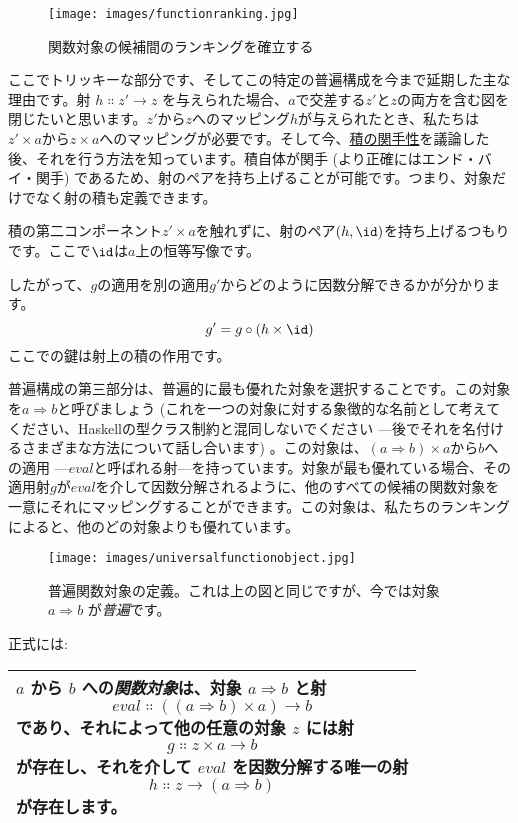 \begin{figure}[H]
  \centering
  \texttt{[image: images/functionranking.jpg]}
  \caption{関数対象の候補間のランキングを確立する}
\end{figure}

\noindent
ここでトリッキーな部分です、そしてこの特定の普遍構成を今まで延期した主な理由です。射 $h \Colon z'\to z$ を与えられた場合、$a$で交差する$z'$と$z$の両方を含む図を閉じたいと思います。$z'$から$z$へのマッピング$h$が与えられたとき、私たちは$z' \times a$から$z \times a$へのマッピングが必要です。そして今、\hyperref[functoriality]{積の関手性}を議論した後、それを行う方法を知っています。積自体が関手 (より正確にはエンド・バイ・関手) であるため、射のペアを持ち上げることが可能です。つまり、対象だけでなく射の積も定義できます。

積の第二コンポーネント$z' \times a$を触れずに、射のペア$(h, \id)$を持ち上げるつもりです。ここで$\id$は$a$上の恒等写像です。

したがって、$g$の適用を別の適用$g'$からどのように因数分解できるかが分かります。
\[g' = g \circ (h \times \id)\]
ここでの鍵は射上の積の作用です。

普遍構成の第三部分は、普遍的に最も優れた対象を選択することです。この対象を$a \Rightarrow b$と呼びましょう (これを一つの対象に対する象徴的な名前として考えてください、Haskellの型クラス制約と混同しないでください ---後でそれを名付けるさまざまな方法について話し合います) 。この対象は、$(a \Rightarrow b) \times a$から$b$への適用 ---$\mathit{eval}$と呼ばれる射---を持っています。対象が最も優れている場合、その適用射$g$が$\mathit{eval}$を介して因数分解されるように、他のすべての候補の関数対象を一意にそれにマッピングすることができます。この対象は、私たちのランキングによると、他のどの対象よりも優れています。

\begin{figure}[H]
  \centering
  \texttt{[image: images/universalfunctionobject.jpg]}
  \caption{普遍関数対象の定義。これは上の図と同じですが、今では対象 $a \Rightarrow b$ が\emph{普遍}です。}
\end{figure}

\noindent
正式には:

\begin{longtable}[]{@{}l@{}}
  \toprule
  \begin{minipage}[t]{0.97\columnwidth}\raggedright\strut
    $a$ から $b$ への\emph{関数対象}は、対象
    $a \Rightarrow b$ と射
    \[\mathit{eval} \Colon ((a \Rightarrow b) \times a) \to b\]
    であり、それによって他の任意の対象 $z$ には射
    \[g \Colon z \times a \to b\]
    が存在し、それを介して $\mathit{eval}$ を因数分解する唯一の射
    \[h \Colon z \to (a \Rightarrow b)\]
    が存在します。
  \end{minipage}\tabularnewline
  \bottomrule
\end{longtable}

